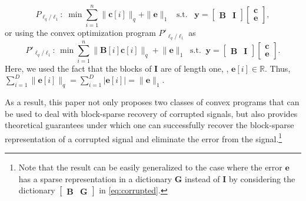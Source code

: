 \documentclass[10pt,twocolumn,twoside] {IEEEtran}
\begin{document}
{\begin{equation}
P_{\ell_q/\ell_1}\!\!: \; \min \sum_{i=1}^{n}{ \| {\boldsymbol{c}}[i] \|_q } +
\| {\boldsymbol{e}} \|_1 \;\; {\operatorname{s. t.}} \;\; {\boldsymbol{y}} = \begin{bmatrix} {\boldsymbol{B}} & {\boldsymbol{I}}
\end{bmatrix} \!\! \begin{bmatrix} {\boldsymbol{c}} \\ {\boldsymbol{e}} \end{bmatrix}\!,
\end{equation}
or using the convex optimization program $P'_{\ell_q/\ell_1}$ as
\begin{equation}
P'_{\ell_q/\ell_1}\!\!\!:  \, \min \!  \sum_{i=1}^{n}{ \!\| {\boldsymbol{B}}[i]
{\boldsymbol{c}}[i] \|_q } \!+\! \| {\boldsymbol{e}} \|_1 \; {\operatorname{s. t.}} \; {\boldsymbol{y}} \!=\! 
\begin{bmatrix} {\boldsymbol{B}} &  {\boldsymbol{I}} \end{bmatrix} \!\! \begin{bmatrix} {\boldsymbol{c}} \\ {\boldsymbol{e}}
\end{bmatrix}\!\!.
\end{equation}
Here, we used the fact that the blocks of ${\boldsymbol{I}}$ are of length one, {}, ${\boldsymbol{e}}[i] \in {\mathbb{R}}$. Thus, $\sum_{i=1}^{D} \| {\boldsymbol{e}}[i] \|_q = \sum_{i=1}^{D} | {\boldsymbol{e}}[i] | = \| {\boldsymbol{e}} \|_1.$

As a result, this paper not only proposes two classes of convex programs that can be used to deal with block-sparse recovery of corrupted signals, but also provides theoretical guarantees under which one can successfully recover the block-sparse representation of a corrupted signal and eliminate the error from the signal.\footnote{Note that the result can be easily generalized to the case where the error ${\boldsymbol{e}}$ has a sparse representation in a dictionary ${\boldsymbol{G}}$ instead of ${\boldsymbol{I}}$ by considering the dictionary $\begin{bmatrix} {\boldsymbol{B}} & {\boldsymbol{G}} \end{bmatrix}$ in \eqref{eq:corrupted}.}

}
\end{document}
